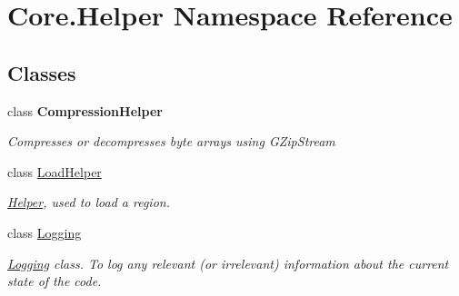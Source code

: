 \hypertarget{namespaceCore_1_1Helper}{}\section{Core.\+Helper Namespace Reference}
\label{namespaceCore_1_1Helper}
\subsection*{Classes}
\begin{DoxyCompactItemize}
\item 
class {\bfseries Compression\+Helper}
\begin{DoxyCompactList}\small\item\em Compresses or decompresses byte arrays using G\+Zip\+Stream \end{DoxyCompactList}\item 
class \hyperlink{classCore_1_1Helper_1_1LoadHelper}{Load\+Helper}
\begin{DoxyCompactList}\small\item\em \hyperlink{namespaceCore_1_1Helper}{Helper}, used to load a region. \end{DoxyCompactList}\item 
class \hyperlink{classCore_1_1Helper_1_1Logging}{Logging}
\begin{DoxyCompactList}\small\item\em \hyperlink{classCore_1_1Helper_1_1Logging}{Logging} class. To log any relevant (or irrelevant) information about the current state of the code. \end{DoxyCompactList}\end{DoxyCompactItemize}
